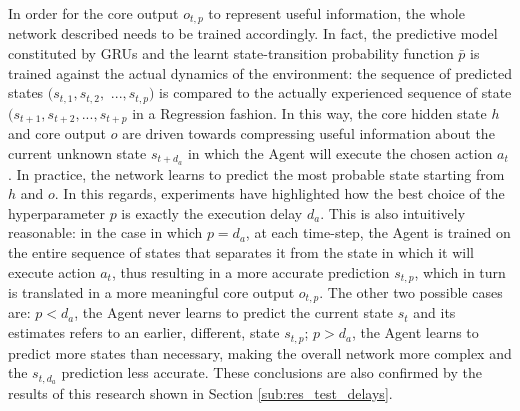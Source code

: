                 In order for the core output $o_{t,p}$ to represent useful information, the whole network described needs to be trained accordingly. In fact, the predictive model constituted by GRUs and the learnt state-transition probability function $\bar{p}$ is trained against the actual dynamics of the environment: the sequence of predicted states $(s_{t, 1}, s_{t, 2}, $ $..., s_{t, p})$ is compared to the actually experienced sequence of state $(s_{t+1}, s_{t+2}, ..., s_{t+p}$ in a Regression fashion. In this way, the core hidden state $h$ and core output $o$ are driven towards compressing useful information about the current unknown state $s_{t+d_a}$ in which the Agent will execute the chosen action $a_t$. In practice, the network learns to predict the most probable state starting from $h$ and $o$. In this regards, experiments have highlighted how the best choice of the hyperparameter $p$ is exactly the execution delay $d_a$. This is also intuitively reasonable: in the case in which $p = d_a$, at each time-step, the Agent is trained on the entire sequence of states that separates it from the state in which it will execute action $a_t$, thus resulting in a more accurate prediction $s_{t, p}$, which in turn is translated in a more meaningful core output $o_{t, p}$. The other two possible cases are: $p < d_a$, the Agent never learns to predict the current state $s_t$ and its estimates refers to an earlier, different, state $s_{t,p}$; $p > d_a$, the Agent learns to predict more states than necessary, making the overall network more complex and the $s_{t, d_a}$ prediction less accurate. These conclusions are also confirmed by the results of this research shown in Section \ref{sub:res_test_delays}.
                
